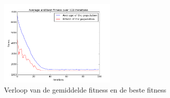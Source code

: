 \documentclass[a4paper,10pt,fleqn]{article}
\begin{document}
    \begin{figure}[!ht]
        \centering
        \includegraphics[width=0.5\textwidth]{images/Fitness_over_iterations}
        \caption{Verloop van de gemiddelde fitness en de beste fitness}
        \label{verloop}
    \end{figure}

    \pagebreak
\end{document}
